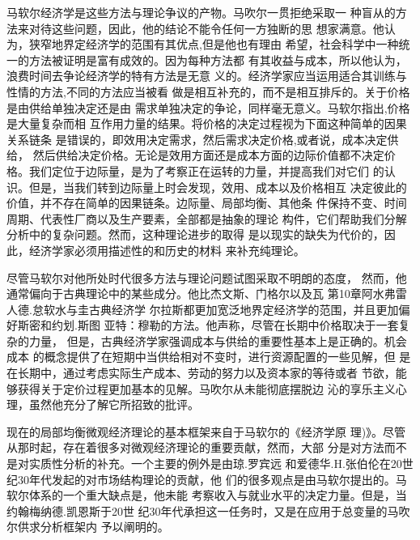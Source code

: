 马软尔经济学是这些方法与理论争议的产物。马吹尔一贯拒绝采取一
种盲从的方法来对待这些问题，因此，他的结论不能令任何一方独断的思
想家满意。他认为，狭窄地界定经济学的范围有其优点,但是他也有理由
希望，社会科学中一种统一的方法被证明是富有成效的。因为每种方法都
有其收益与成本，所以他认为，浪费时间去争论经济学的特有方法是无意
义的。经济学家应当运用适合其训练与性情的方法,不同的方法应当被看
做是相互补充的，而不是相互排斥的。关于价格是由供给单独决定还是由
需求单独决定的争论，同样毫无意义。马软尔指出,价格是大量复杂而相
互作用力量的结果。将价格的决定过程视为下面这种简单的因果关系链条
是错误的，即效用决定需求，然后需求决定价格,或者说，成本决定供给，
然后供给决定价格。无论是效用方面还是成本方面的边际价值都不决定价
格。我们定位于边际量，是为了考察正在运转的力量，并提高我们对它们
的认识。但是，当我们转到边际量上时会发现，效用、成本以及价格相互
决定彼此的价值，并不存在简单的因果链条。边际量、局部均衡、其他条
件保持不变、时间周期、代表性厂商以及生产要素，全部都是抽象的理论
构件，它们帮助我们分解分析中的复杂问题。然而，这种理论进步的取得
是以现实的缺失为代价的，因此，经济学家必须用描述性的和历史的材料
来补充纯理论。

尽管马软尔对他所处时代很多方法与理论问题试图采取不明朗的态度，
然而，他通常偏向于古典理论中的某些成分。他比杰文斯、门格尔以及瓦
第10章阿水弗雷人德.怠软水与圭古典经济学
尔拉斯都更加宽泛地界定经济学的范围，并且更加偏好斯密和约划.斯图
亚特：穆勒的方法。他声称，尽管在长期中价格取决于一套复杂的力量，
但是，古典经济学家强调成本与供给的重要性基本上是正确的。机会成本
的概念提供了在短期中当供给相对不变时，进行资源配置的一些见解，但
是在长期中，通过考虑实际生产成本、劳动的努力以及资本家的等待或者
节欲，能够获得关于定价过程更加基本的见解。马吹尔从未能彻底摆脱边
沁的享乐主义心理，虽然他充分了解它所招致的批评。

现在的局部均衡微观经济理论的基本框架来自于马软尔的《经济学原
理)》。尽管从那时起，存在着很多对微观经济理论的重要贡献，然而，大部
分是对方法而不是对实质性分析的补充。一个主要的例外是由琼.罗宾远
和爱德华.H.张伯伦在20世纪30年代发起的对市场结构理论的贡献，他
们的很多观点是由马软尔提出的。马软尔体系的一个重大缺点是，他未能
考察收入与就业水平的决定力量。但是，当约翰梅纳德.凯恩斯于20世
纪30年代承担这一任务时，又是在应用于总变量的马吹尔供求分析框架内
予以阐明的。




